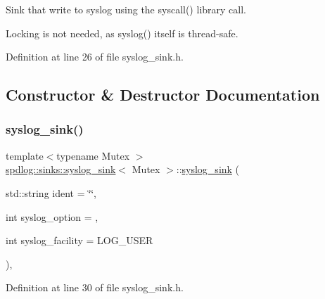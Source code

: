 Sink that write to syslog using the {\ttfamily syscall()} library call.

Locking is not needed, as {\ttfamily syslog()} itself is thread-\/safe. 

Definition at line 26 of file syslog\+\_\+sink.\+h.



\subsection{Constructor \& Destructor Documentation}
\mbox{\label{classspdlog_1_1sinks_1_1syslog__sink_acc60de632a07b329aeba41ee48ced4f6}} 
\subsubsection{\texorpdfstring{syslog\+\_\+sink()}{syslog\_sink()}\hspace{0.1cm}{\footnotesize\ttfamily [1/2]}}
{\footnotesize\ttfamily template$<$typename Mutex $>$ \\
\hyperlink{classspdlog_1_1sinks_1_1syslog__sink}{spdlog\+::sinks\+::syslog\+\_\+sink}$<$ Mutex $>$\+::\hyperlink{classspdlog_1_1sinks_1_1syslog__sink}{syslog\+\_\+sink} (\begin{DoxyParamCaption}\item[{std\+::string}]{ident = {\ttfamily \char`\"{}\char`\"{}},  }\item[{int}]{syslog\+\_\+option = {},  }\item[{int}]{syslog\+\_\+facility = {\ttfamily LOG\+\_\+USER} }\end{DoxyParamCaption})\hspace{0.3cm}{\ttfamily [inline]}, {\ttfamily [explicit]}}



Definition at line 30 of file syslog\+\_\+sink.\+h.


